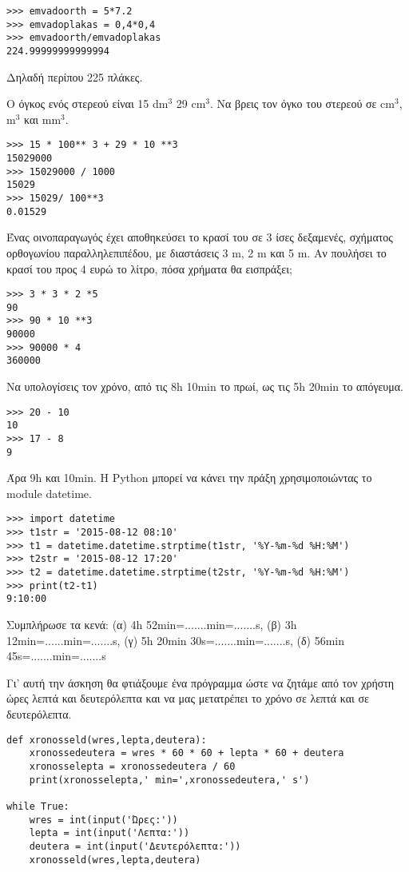 \begin{lstlisting}
>>> emvadoorth = 5*7.2
>>> emvadoplakas = 0,4*0,4
>>> emvadoorth/emvadoplakas
224.99999999999994
\end{lstlisting}
Δηλαδή περίπου 225 πλάκες.
\begin{exercise}
Ο όγκος ενός στερεού είναι 15 dm$^3$ 29 cm$^3$. Να βρεις τον όγκο του στερεού σε cm$^3$, m$^3$ και mm$^3$.
\end{exercise}
\begin{lstlisting}
>>> 15 * 100** 3 + 29 * 10 **3
15029000
>>> 15029000 / 1000
15029
>>> 15029/ 100**3
0.01529
\end{lstlisting}
\begin{exercise}
Ένας οινοπαραγωγός έχει αποθηκεύσει το κρασί του σε 3 ίσες δεξαμενές, σχήματος
ορθογωνίου παραλληλεπιπέδου, με διαστάσεις 3 m, 2 m και 5 m.
Aν πουλήσει το κρασί του προς 4 ευρώ το λίτρο, πόσα χρήματα θα εισπράξει;
\end{exercise}
\begin{lstlisting}
>>> 3 * 3 * 2 *5 
90
>>> 90 * 10 **3
90000
>>> 90000 * 4
360000
\end{lstlisting}
\begin{exercise}
Να υπολογίσεις τον χρόνο, από τις 8h 10min το πρωί, ως τις 5h 20min το απόγευμα.
\end{exercise}
\begin{lstlisting}
>>> 20 - 10
10
>>> 17 - 8
9
\end{lstlisting}
Άρα 9h και 10min.
H Python μπορεί να κάνει την πράξη χρησιμοποιώντας το module datetime. 
\begin{lstlisting}
>>> import datetime
>>> t1str = '2015-08-12 08:10'
>>> t1 = datetime.datetime.strptime(t1str, '%Y-%m-%d %H:%M')
>>> t2str = '2015-08-12 17:20'
>>> t2 = datetime.datetime.strptime(t2str, '%Y-%m-%d %H:%M')
>>> print(t2-t1)
9:10:00
\end{lstlisting}
\begin{exercise}
Συμπλήρωσε τα κενά: (α) 4h 52min=.......min=.......s, (β) 3h 12min=......min=.......s,
(γ) 5h 20min 30s=.......min=.......s, (δ) 56min 45s=.......min=.......s
\end{exercise}
Γι' αυτή την άσκηση θα φτιάξουμε ένα πρόγραμμα ώστε να ζητάμε από τον χρήστη ώρες λεπτά και δευτερόλεπτα και να μας μετατρέπει το χρόνο σε λεπτά και σε δευτερόλεπτα.
\begin{lstlisting}
def xronosseld(wres,lepta,deutera):
    xronossedeutera = wres * 60 * 60 + lepta * 60 + deutera
    xronosselepta = xronossedeutera / 60
    print(xronosselepta,' min=',xronossedeutera,' s')

while True:
    wres = int(input('Ώρες:'))
    lepta = int(input('Λεπτα:'))
    deutera = int(input('Δευτερόλεπτα:'))
    xronosseld(wres,lepta,deutera)
\end{lstlisting}

